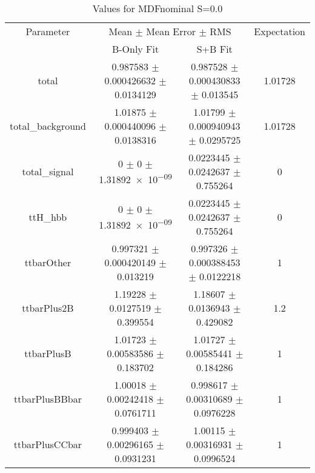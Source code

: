 \begin{table}
\centering
\caption{Values for MDFnominal S=0.0}
\begin{tabular}{cccc}
\toprule
Parameter & \multicolumn{2}{c}{Mean $\pm$ Mean Error $\pm$ RMS} & Expectation\\
 & B-Only Fit & S+B Fit & \\
\midrule
total & \num{0.987583} $\pm$ \num{0.000426632} $\pm$ \num{0.0134129} & \num{0.987528} $\pm$ \num{0.000430833} $\pm$ \num{0.013545} & \num{1.01728}\\
total\_background & \num{1.01875} $\pm$ \num{0.000440096} $\pm$ \num{0.0138316} & \num{1.01799} $\pm$ \num{0.000940943} $\pm$ \num{0.0295725} & \num{1.01728}\\
total\_signal & \num{0} $\pm$ \num{0} $\pm$ \num{1.31892e-09} & \num{0.0223445} $\pm$ \num{0.0242637} $\pm$ \num{0.755264} & \num{0}\\
ttH\_hbb & \num{0} $\pm$ \num{0} $\pm$ \num{1.31892e-09} & \num{0.0223445} $\pm$ \num{0.0242637} $\pm$ \num{0.755264} & \num{0}\\
ttbarOther & \num{0.997321} $\pm$ \num{0.000420149} $\pm$ \num{0.013219} & \num{0.997326} $\pm$ \num{0.000388453} $\pm$ \num{0.0122218} & \num{1}\\
ttbarPlus2B & \num{1.19228} $\pm$ \num{0.0127519} $\pm$ \num{0.399554} & \num{1.18607} $\pm$ \num{0.0136943} $\pm$ \num{0.429082} & \num{1.2}\\
ttbarPlusB & \num{1.01723} $\pm$ \num{0.00583586} $\pm$ \num{0.183702} & \num{1.01727} $\pm$ \num{0.00585441} $\pm$ \num{0.184286} & \num{1}\\
ttbarPlusBBbar & \num{1.00018} $\pm$ \num{0.00242418} $\pm$ \num{0.0761711} & \num{0.998617} $\pm$ \num{0.00310689} $\pm$ \num{0.0976228} & \num{1}\\
ttbarPlusCCbar & \num{0.999403} $\pm$ \num{0.00296165} $\pm$ \num{0.0931231} & \num{1.00115} $\pm$ \num{0.00316931} $\pm$ \num{0.0996524} & \num{1}\\
\bottomrule
\end{tabular}
\end{table}